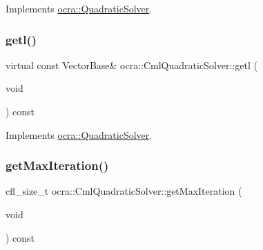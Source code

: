 Implements \hyperlink{classocra_1_1QuadraticSolver_a7f15d5d3c28feac3204542c885d68586}{ocra\+::\+Quadratic\+Solver}.

\hypertarget{classocra_1_1CmlQuadraticSolver_a963b8e8e4f099e89003be3c9cb77fa90}{}\label{classocra_1_1CmlQuadraticSolver_a963b8e8e4f099e89003be3c9cb77fa90} 
\subsubsection{\texorpdfstring{getl()}{getl()}}
{\footnotesize\ttfamily virtual const Vector\+Base\& ocra\+::\+Cml\+Quadratic\+Solver\+::getl (\begin{DoxyParamCaption}\item[{void}]{ }\end{DoxyParamCaption}) const\hspace{0.3cm}{\ttfamily [virtual]}}



Implements \hyperlink{classocra_1_1QuadraticSolver_a13e3a471615ca667daadf490dedc18eb}{ocra\+::\+Quadratic\+Solver}.

\hypertarget{classocra_1_1CmlQuadraticSolver_a89d29bf8618e4d658f6234dd967165ad}{}\label{classocra_1_1CmlQuadraticSolver_a89d29bf8618e4d658f6234dd967165ad} 
\subsubsection{\texorpdfstring{get\+Max\+Iteration()}{getMaxIteration()}}
{\footnotesize\ttfamily cfl\+\_\+size\+\_\+t ocra\+::\+Cml\+Quadratic\+Solver\+::get\+Max\+Iteration (\begin{DoxyParamCaption}\item[{void}]{ }\end{DoxyParamCaption}) const}

\hypertarget{classocra_1_1CmlQuadraticSolver_a95f1b52f24a43f9afc38b36fb7943e05}{}\label{classocra_1_1CmlQuadraticSolver_a95f1b52f24a43f9afc38b36fb7943e05} 
